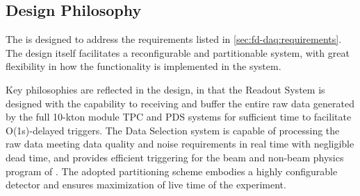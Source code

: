 
\subsection{Design Philosophy}

The    is designed to address the requirements listed in
\ref{sec:fd-daq:requirements}. The design itself facilitates a
reconfigurable and partitionable  system, with great flexibility in how
the  functionality is implemented in the system. 

Key philosophies are reflected in the design, in that the Readout System is
designed with the capability to receiving and buffer the entire raw data generated by
the full 10-kton module TPC and PDS systems for sufficient time to
facilitate O(1s)-delayed triggers. The Data Selection system
is capable of processing the raw data meeting data quality and noise
requirements in real time with negligible dead time, and provides
efficient triggering for the beam and non-beam physics program of
. The adopted  partitioning scheme embodies a highly configurable detector and ensures
maximization of live time of the experiment. 

